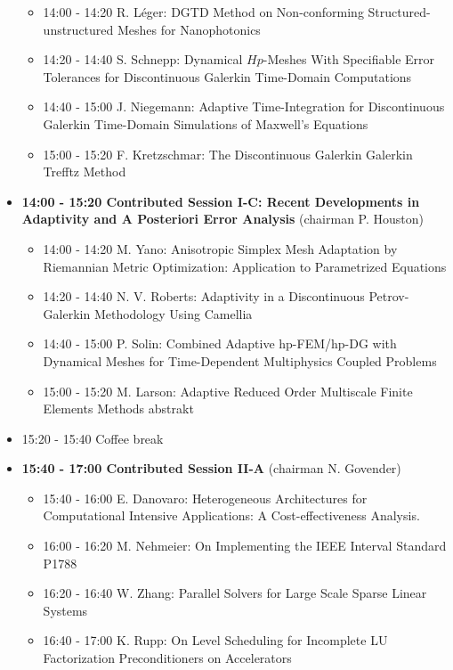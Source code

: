 \documentclass[10pt, A4]{article}%
\begin{document}
\begin{itemize}
\begin{itemize}
    \item 14:00 - 14:20 {R. Léger}: {DGTD  Method  on  Non-conforming  Structured-unstructured  Meshes  for Nanophotonics}
    \item 14:20 - 14:40 {S. Schnepp}: {Dynamical $Hp$-Meshes With Specifiable Error Tolerances for Discontinuous Galerkin Time-Domain Computations}
    \item 14:40 - 15:00 {J. Niegemann}: {Adaptive Time-Integration for Discontinuous Galerkin Time-Domain Simulations of Maxwell's Equations}
    \item 15:00 - 15:20 {F. Kretzschmar}: {The Discontinuous Galerkin Galerkin Trefftz Method}
  \end{itemize}
    \item {\bf 14:00 - 15:20 Contributed Session I-C: Recent Developments in Adaptivity and A Posteriori Error Analysis} (chairman P. Houston) 
  \begin{itemize}
    \item 14:00 - 14:20 {M. Yano}: {Anisotropic Simplex Mesh Adaptation by Riemannian Metric Optimization: Application to Parametrized Equations}
    \item 14:20 - 14:40 {N. V. Roberts}: {Adaptivity in a Discontinuous Petrov-Galerkin Methodology Using Camellia}
    \item 14:40 - 15:00 {P. Solin}: Combined Adaptive hp-FEM/hp-DG with Dynamical Meshes for Time-Dependent Multiphysics Coupled Problems
    \item 15:00 - 15:20 {M. Larson}: Adaptive Reduced Order Multiscale Finite Elements Methods abstrakt
  \end{itemize}
  \item 15:20 - 15:40 Coffee break
  \newpage
  \item {\bf 15:40 - 17:00 Contributed Session II-A} (chairman N. Govender) 
  \begin{itemize}
    \item 15:40 - 16:00 {E. Danovaro}: {Heterogeneous Architectures for Computational Intensive Applications: A Cost-effectiveness Analysis.}
    \item 16:00 - 16:20 {M. Nehmeier}: {On Implementing the IEEE Interval Standard P1788}
    \item 16:20 - 16:40 {W. Zhang}: {Parallel Solvers for Large Scale Sparse Linear Systems} %
    \item 16:40 - 17:00 {K. Rupp}: {On Level Scheduling for Incomplete LU Factorization Preconditioners on Accelerators}
  \end{itemize}

\end{itemize}
\end{document}
